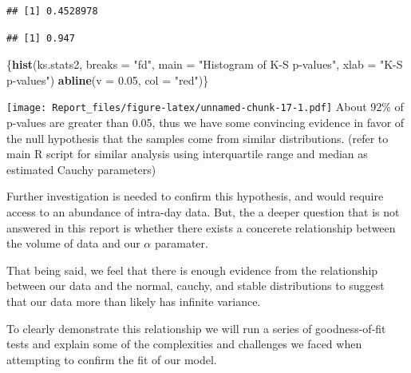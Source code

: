 \documentclass[]{article}
\newenvironment{Shaded}{\begin{snugshade}}{\end{snugshade}}
\newcommand{\CommentTok}[1]{\textcolor[rgb]{0.56,0.35,0.01}{\textit{#1}}}
\newcommand{\DataTypeTok}[1]{\textcolor[rgb]{0.13,0.29,0.53}{#1}}
\newcommand{\FloatTok}[1]{\textcolor[rgb]{0.00,0.00,0.81}{#1}}
\newcommand{\KeywordTok}[1]{\textcolor[rgb]{0.13,0.29,0.53}{\textbf{#1}}}
\newcommand{\NormalTok}[1]{#1}
\newcommand{\OperatorTok}[1]{\textcolor[rgb]{0.81,0.36,0.00}{\textbf{#1}}}
\newcommand{\StringTok}[1]{\textcolor[rgb]{0.31,0.60,0.02}{#1}}
\begin{document}
\begin{verbatim}
## [1] 0.4528978
\end{verbatim}

\begin{Shaded}
\end{Shaded}

\begin{verbatim}
## [1] 0.947
\end{verbatim}

\begin{Shaded}
\begin{Highlighting}[]
\NormalTok{\{}\KeywordTok{hist}\NormalTok{(ks.stats2, }\DataTypeTok{breaks =} \StringTok{"fd"}\NormalTok{, }\DataTypeTok{main =} \StringTok{"Histogram of K-S p-values"}\NormalTok{, }\DataTypeTok{xlab =} \StringTok{"K-S p-values"}\NormalTok{)}
\KeywordTok{abline}\NormalTok{(}\DataTypeTok{v =} \FloatTok{0.05}\NormalTok{, }\DataTypeTok{col =} \StringTok{"red"}\NormalTok{)\}}
\end{Highlighting}
\end{Shaded}

\texttt{[image: Report\_files/figure-latex/unnamed-chunk-17-1.pdf]} About
92\% of p-values are greater than 0.05, thus we have some convincing
evidence in favor of the null hypothesis that the samples come from
similar distributions. (refer to main R script for similar analysis
using interquartile range and median as estimated Cauchy parameters)

Further investigation is needed to confirm this hypothesis, and would
require access to an abundance of intra-day data. But, the a deeper
question that is not answered in this report is whether there exists a
concerete relationship between the volume of data and our \(\alpha\)
paramater.

That being said, we feel that there is enough evidence from the
relationship between our data and the normal, cauchy, and stable
distributions to suggest that our data more than likely has infinite
variance.

To clearly demonstrate this relationship we will run a series of
goodness-of-fit tests and explain some of the complexities and
challenges we faced when attempting to confirm the fit of our model.
\end{document}
